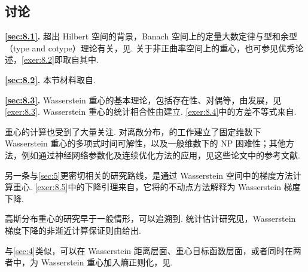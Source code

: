 \subsection{讨论}\label{sec:8.4}
\noindent\textbf{\autoref{sec:8.1}.} 超出 Hilbert 空间的背景，Banach 空间上的定量大数定律与型和余型（type and cotype）理论有关，见\cite{ref201}. 关于非正曲率空间上的重心，也可参见优秀论述\cite{ref293}，\autoref{exer:8.2}即取自其中.

\noindent\textbf{\autoref{sec:8.2}.} 本节材料取自\cite{ref4,ref199}.

\noindent\textbf{\autoref{sec:8.3}.} Wasserstein 重心的基本理论，包括存在性、对偶等，由\cite{ref3}发展，见\autoref{exer:8.3}. Wasserstein 重心的统计相合性由\cite{ref197}建立. \autoref{exer:8.4}中的方差不等式来自\cite{ref81}.

重心的计算也受到了大量关注. 对离散分布，\cite{ref9,ref10}的工作建立了固定维数下 Wasserstein 重心的多项式时间可解性，以及一般维数下的 NP 困难性；其他方法，例如通过神经网络参数化及连续优化方法的应用，见这些论文中的参考文献.

另一条与\autoref{sec:5}更密切相关的研究路线，是通过 Wasserstein 空间中的梯度方法计算重心\cite{ref13,ref14,ref28,ref53,ref81,ref189,ref329}. \autoref{exer:8.5}中的下降引理来自\cite{ref329}，它将\cite{ref14}的不动点方法解释为 Wasserstein 梯度下降.

高斯分布重心的研究早于一般情形，可以追溯到\cite{ref178,ref277}. 统计估计研究见\cite{ref188}，Wasserstein 梯度下降的非渐近计算保证则由\cite{ref13,ref81}给出.

与\autoref{sec:4}类似，可以在 Wasserstein 距离层面、重心目标函数层面，或者同时在两者中，为 Wasserstein 重心加入熵正则化，见\cite{ref37,ref65,ref82,ref187,ref207,ref312}.
